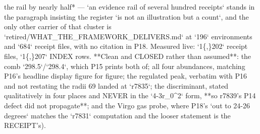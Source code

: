 \begin{description}
the rail by nearly half* --- `an evidence rail of several hundred receipts` stands in the paragraph insisting the register `is not an illustration but a count`, and the only other carrier of that cluster is `retired/WHAT\_THE\_FRAMEWORK\_DELIVERS.md` at `196` environments and `684` receipt files, with no citation in P18. Measured live: `1\{,\}202` receipt files, `1\{,\}207` INDEX rows.  **Clean and CLOSED rather than assumed**: the comb `298.5`/`298.4`, which P15 prints both of; all four abundances, matching P16's headline display figure for figure; the regulated peak, verbatim with P16 and not restating the radii 69 landed at `r7835`; the discriminant, stated qualitatively in four places and NEVER in the `4-3r\_0\textasciicircum{}2` form, **so r7839's P14 defect did not propagate**; and the Virgo gas probe, where P18's `out to 24-26 degrees` matches the `r7831` computation and the looser statement is the RECEIPT's). 

\end{description}
